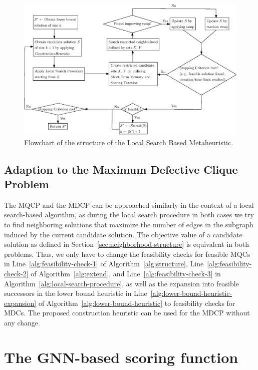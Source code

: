 \documentclass[draft,final]{vutinfth} %
\begin{document}
\begin{figure}
    \centering
    \includegraphics[width=\textwidth]{graphics/flowchart_local_search_algorithm.eps}
    \caption{Flowchart of the structure of the Local Search Based Metaheuristic.}
    \label{fig:flowchart-local-search-algorithm}
\end{figure}
 
\section{Adaption to the Maximum Defective Clique Problem}\label{sec:adaption-to-mdcp}
The MQCP and the MDCP can be approached similarly in the context of a local search-based algorithm, as during the local search procedure in both cases we try to find neighboring solutions that maximize the number of edges in the subgraph induced by the current candidate solution. The objective value of a candidate solution as defined in Section~\ref{sec:neighborhood-structure} is equivalent in both problems. Thus, we only have to change the feasibility checks for feasible MQCs in Line~\ref{alg:feasibility-check-1} of Algorithm~\ref{alg:structure}, Line~\ref{alg:feasibility-check-2} of Algorithm~\ref{alg:extend}, and Line~\ref{alg:feasibility-check-3} in Algorithm~\ref{alg:local-search-procedure}, as well as the expansion into feasible successors in the lower bound heuristic in Line~\ref{alg:lower-bound-heuristic-expansion} of Algorithm~\ref{alg:lower-bound-heuristic} to feasibility checks for MDCs. The proposed construction heuristic can be used for the MDCP without any change.  

\chapter{The GNN-based scoring function}\label{chp:gnn}
\end{document}
